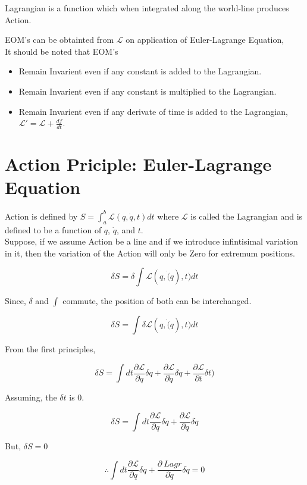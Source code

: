 \documentclass[a4paper]{article}
\newcommand{\Lagr}{\mathcal{L}}
\newcommand{\ddtf}[1]{\frac{d #1}{dt}}
\begin{document}
		Lagrangian is a function which when integrated along the world-line produces Action.

		EOM's can be obtainted from $\Lagr$ on application of Euler-Lagrange Equation, \hfill \\
		
		It should be noted that EOM's
		\begin{itemize}
			\item Remain Invarient even if any constant is added to the Lagrangian.
			\item Remain Invarient even if any constant is multiplied to the Lagrangian.
			\item Remain Invarient even if any derivate of time is added to the Lagrangian, $\Lagr' = \Lagr + \ddtf{f}$. 
	
		\end{itemize}

	\section*{Action Priciple: Euler-Lagrange Equation }
		
		Action is defined by $S = \int_a^b \Lagr(q, \dot{q}, t) dt$ where $\Lagr$ is called the Lagrangian and is defined to be a function of $q$, $\dot{q}$, and $t$. \hfill \\

		Suppose, if we assume Action be a line and if we introduce infintisimal variation in it, then the variation of the Action will only be Zero for extremum positions.

		$$ \delta S = \delta \int \Lagr(q, \dot(q), t) dt $$

		Since, $\delta$ and $\int$ commute, the position of both can be interchanged.

		$$ \delta S = \int \delta \Lagr(q, \dot(q), t) dt $$

		From the first principles,

		$$ \delta S = \int dt \frac{\partial\Lagr}{\partial q}\delta q + \frac{\partial\Lagr}{\partial\dot{q}}\delta \dot{q} + \frac{\partial\Lagr}{\partial t}\delta t) $$

		Assuming, the $\delta t$ is $0$.

		$$ \delta S = \int dt \frac{\partial\Lagr}{\partial q}\delta q + \frac{\partial\Lagr}{\partial\dot{q}}\delta \dot{q} $$

		But, $\delta S = 0$

		$$ \therefore \int dt \frac{\partial\Lagr}{\partial q}\delta q + \frac{\partial\ Lagr}{\partial\dot{q}}\delta \dot{q} = 0 $$
\end{document}
